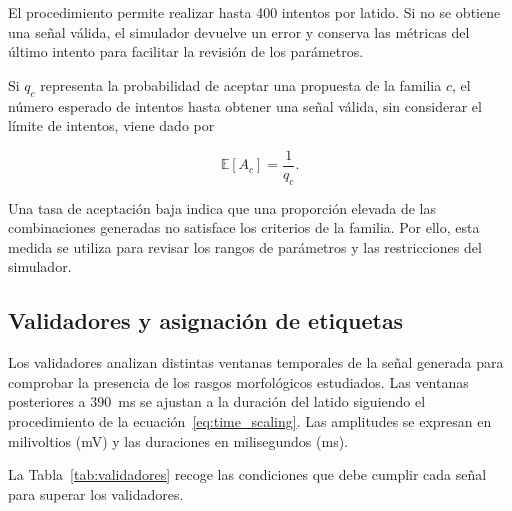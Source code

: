 El procedimiento permite realizar hasta 400 intentos por latido. Si no se obtiene una señal válida, el simulador devuelve un error y conserva las métricas del último intento para facilitar la revisión de los parámetros.

Si \(q_c\) representa la probabilidad de aceptar una propuesta de la familia \(c\), el número esperado de intentos hasta obtener una señal válida, sin considerar el límite de intentos, viene dado por

\begin{equation}
\mathbb{E}[A_c] =
\frac{1}{q_c}.
\end{equation}

Una tasa de aceptación baja indica que una proporción elevada de las combinaciones generadas no satisface los criterios de la familia. Por ello, esta medida se utiliza para revisar los rangos de parámetros y las restricciones del simulador.

\subsection{Validadores y asignación de etiquetas}

Los validadores analizan distintas ventanas temporales de la señal generada para comprobar la presencia de los rasgos morfológicos estudiados. Las ventanas posteriores a 390~ms se ajustan a la duración del latido siguiendo el procedimiento de la ecuación~\ref{eq:time_scaling}. Las amplitudes se expresan en milivoltios (mV) y las duraciones en milisegundos (ms).

La Tabla~\ref{tab:validadores} recoge las condiciones que debe cumplir cada señal para superar los validadores.

